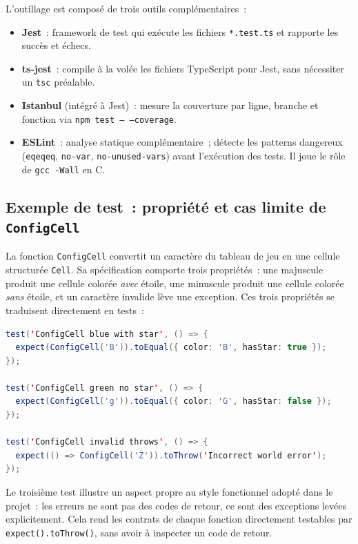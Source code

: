 \documentclass[12pt,a4paper]{article}
\begin{document}
L'outillage est composé de trois outils complémentaires~:

\begin{itemize}
  \item \textbf{Jest}~: framework de test qui exécute les fichiers
    \texttt{*.test.ts} et rapporte les succès et échecs.
  \item \textbf{ts-jest}~: compile à la volée les fichiers TypeScript
    pour Jest, sans nécessiter un \texttt{tsc} préalable.
  \item \textbf{Istanbul} (intégré à Jest)~: mesure la couverture par
    ligne, branche et fonction via \texttt{npm test -- --coverage}.
  \item \textbf{ESLint}~: analyse statique complémentaire~; détecte les
    patterns dangereux (\texttt{eqeqeq}, \texttt{no-var},
    \texttt{no-unused-vars}) avant l'exécution des tests. Il joue le
    rôle de \texttt{gcc -Wall} en C.
\end{itemize}
 
\subsection{Exemple de test~: propriété et cas limite de \texttt{ConfigCell}}
\label{subsec:r-exemple}
 
La fonction \texttt{ConfigCell} convertit un caractère du tableau de jeu
en une cellule structurée \texttt{Cell}. Sa spécification comporte trois
propriétés~: une majuscule produit une cellule colorée \emph{avec} étoile,
une minuscule produit une cellule colorée \emph{sans} étoile, et un
caractère invalide lève une exception. Ces trois propriétés se
traduisent directement en tests~:
 
\begin{lstlisting}[caption={Tests de \texttt{ConfigCell} (world.test.ts).},
                   language=Java]
test('ConfigCell blue with star', () => {
  expect(ConfigCell('B')).toEqual({ color: 'B', hasStar: true });
});
 
test('ConfigCell green no star', () => {
  expect(ConfigCell('g')).toEqual({ color: 'G', hasStar: false });
});
 
test('ConfigCell invalid throws', () => {
  expect(() => ConfigCell('Z')).toThrow('Incorrect world error');
});
\end{lstlisting}
 
Le troisième test illustre un aspect propre au style fonctionnel adopté
dans le projet~: les erreurs ne sont pas des codes de retour, ce sont des
exceptions levées explicitement. Cela rend les contrats de chaque
fonction directement testables par \texttt{expect().toThrow()}, sans
avoir à inspecter un code de retour.
 
\end{document}
